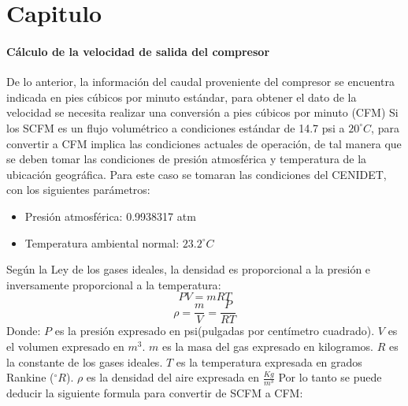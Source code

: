 

\chapter{Capitulo}

\subsubsection{C\'alculo de la velocidad de salida del compresor}
De lo anterior, la informaci\'on del caudal proveniente del compresor se encuentra indicada en pies c\'ubicos por minuto estándar, para obtener el dato de la velocidad se necesita realizar una conversi\'on a pies cúbicos por minuto (CFM)
\newline
Si los SCFM es un flujo volum\'etrico a condiciones estándar de 14.7 psi a $20^\circ C$, para convertir a CFM implica las condiciones actuales de operaci\'on, de tal manera que se deben tomar las condiciones de presi\'on atmosférica y temperatura de la ubicación geográfica. Para este caso se tomaran las condiciones del CENIDET, con los siguientes parámetros:
\begin{itemize}
	\item Presión atmosférica: 0.9938317 atm
	\item Temperatura ambiental normal: $23.2^\circ C$
\end{itemize}
Según la Ley de los gases ideales, la densidad es proporcional a la presión e inversamente proporcional a la temperatura\cite{Cengel2022}:
\begin{equation}
	PV=mRT
\end{equation}
\begin{equation}
	\rho=\frac{m}{V}=\frac{P}{RT}
\end{equation}
Donde:
\newline
$P$ es la presión expresado en psi(pulgadas por centímetro cuadrado).
\newline
$V$ es el volumen expresado en $m^3$.
\newline
$m$ es la masa del gas expresado en kilogramos.
\newline
$R$ es la constante de los gases ideales.
\newline
$T$ es la temperatura expresada en grados Rankine ($^\circ R$).
\newline
$\rho$ es la densidad del aire expresada en $\frac{Kg}{m^3}$
\newline
Por lo tanto se puede deducir la siguiente formula para convertir de SCFM a CFM:
